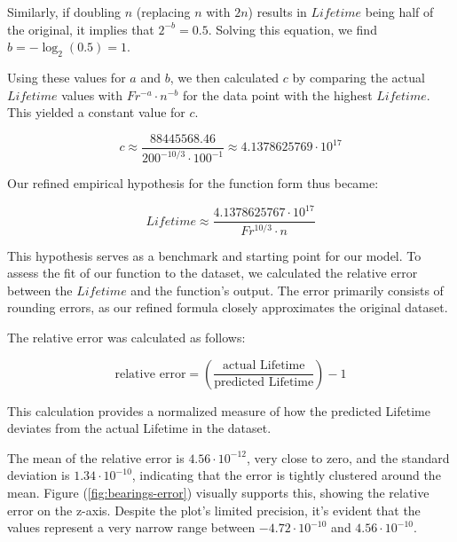 Similarly, if doubling \(n\) (replacing \(n\) with \(2n\)) results in \(Lifetime\) being half of the original, it implies that \(2^{-b} = 0.5\). Solving this equation, we find \(b = -\log_2(0.5) = 1\).

Using these values for \(a\) and \(b\), we then calculated \(c\) by comparing the actual \(Lifetime\) values with \(Fr^{-a} \cdot n^{-b}\) for the data point with the highest \(Lifetime\). This yielded a constant value for \(c\).

\begin{equation}
\label{eq:constant_c}
c \approx \frac{88445568.46}{200^{-10/3} \cdot 100^{-1}} \approx 4.1378625769 \cdot 10^{17}
\end{equation}

Our refined empirical hypothesis for the function form thus became:

\begin{equation}
\label{eq:refined_hypothesis}
Lifetime \approx \frac{4.1378625767 \cdot 10^{17}}{Fr^{10/3} \cdot n}
\end{equation}

This hypothesis serves as a benchmark and starting point for our model. To assess the fit of our function to the dataset, we calculated the relative error between the \(Lifetime\) and the function's output. The error primarily consists of rounding errors, as our refined formula closely approximates the original dataset.

The relative error was calculated as follows:

\begin{equation}
\text{relative error} = \left(\frac{\text{actual Lifetime}}{\text{predicted Lifetime}}\right) - 1
\end{equation}

This calculation provides a normalized measure of how the predicted Lifetime deviates from the actual Lifetime in the dataset.

The mean of the relative error is \(4.56 \cdot 10^{-12}\), very close to zero, and the standard deviation is \(1.34 \cdot 10^{-10}\), indicating that the error is tightly clustered around the mean. Figure (\ref{fig:bearings-error}) visually supports this, showing the relative error on the z-axis. Despite the plot's limited precision, it's evident that the values represent a very narrow range between \(-4.72 \cdot 10^{-10}\) and \(4.56 \cdot 10^{-10}\).

